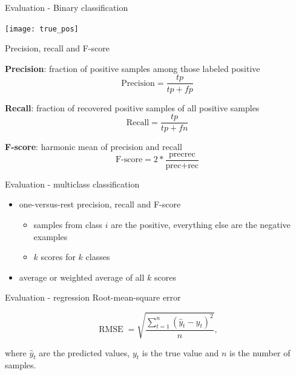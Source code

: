 \documentclass[bigger]{beamer}
\begin{document}
\begin{frame}{Evaluation - Binary classification}
    \begin{center}
\texttt{[image: true\_pos]}
    \end{center}
\end{frame}

\begin{frame}{Precision, recall and F-score}

{\bf Precision}: fraction of positive samples among those labeled positive
\begin{equation*}
	\text{Precision}=\frac{tp}{tp+fp}
\end{equation*}

{\bf Recall}: fraction of recovered positive samples of all positive samples
\begin{equation*}
	\text{Recall}=\frac{tp}{tp+fn}
\end{equation*}

\pause

{\bf F-score}: harmonic mean of precision and recall
    \begin{equation*}
        \text{F-score} = 2 * \frac{\text{prec}  \text{rec}}{\text{prec} + \text{rec}}
    \end{equation*}
\end{frame}

\begin{frame}{Evaluation - multiclass classification}
    \begin{itemize}
        \item one-versus-rest precision, recall and F-score
            \begin{itemize}
                \item samples from class $i$ are the positive, everything else are the negative examples
                \item $k$ scores for $k$ classes
            \end{itemize}
        \item average or weighted average of all $k$ scores
    \end{itemize}
\end{frame}

\begin{frame}{Evaluation - regression}
    Root-mean-square error

    \begin{equation*}
        \operatorname{RMSE}=\sqrt{\frac{\sum_{t=1}^n (\hat y_t - y_t)^2}{n}},
    \end{equation*}

    where $\hat y_t$ are the predicted values, $y_t$ is the true value and $n$ is the number of samples.
\end{frame}
\end{document}
